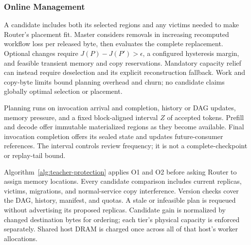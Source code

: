 \subsubsection{Online Management}
\label{sec:teacher-master-online}
\label{sec:teacher-execution}

A candidate includes both its selected regions and any victims needed
to make Router's placement fit. Master considers removals in increasing
recomputed workflow loss per released byte, then evaluates the complete
replacement. Optional changes require $J(P)-J(P')>\epsilon$, a configured
hysteresis margin, and feasible transient memory and copy reservations.
Mandatory capacity relief can instead require deselection and its
explicit reconstruction fallback. Work and copy-byte limits bound
planning overhead and churn; no candidate claims globally optimal
selection or placement.

Planning runs on invocation arrival and completion, history or DAG
updates, memory pressure, and a fixed block-aligned interval $Z$ of
accepted tokens. Prefill and decode offer immutable materialized regions
as they become available. Final invocation completion offers its sealed
state and updates future-consumer references. The interval controls
review frequency; it is not a complete-checkpoint or replay-tail bound.

Algorithm~\ref{alg:teacher-protection} applies O1 and O2 before asking Router to assign
memory locations. Every candidate comparison includes current replicas,
victims, migrations, and normal-service copy interference. Version checks
cover the DAG, history, manifest, and quotas. A stale or infeasible
plan is requeued without advertising its proposed replicas. Candidate
gain is normalized by changed destination bytes for ordering; each
tier's physical capacity is enforced separately. Shared host DRAM is
charged once across all of that host's worker allocations.

